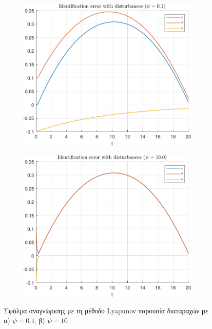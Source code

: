 \documentclass[a4paper,12pt]{article}
\begin{document}
\begin{figure}[h!]
    \centering
    \begin{subfigure}{0.45\textwidth}
        \centering
        \includegraphics[width=\linewidth]{
        plot/task2_identification_error_disturbances_1.pdf}
        \caption{}
        \label{fig:task2_identification_error_disturbances_1}
    \end{subfigure}
    \hfill
    \begin{subfigure}{0.45\textwidth}
        \centering
        \includegraphics[width=\linewidth]{
        plot/task2_identification_error_disturbances_2.pdf}
        \caption{}
        \label{fig:task2_identification_error_disturbances_2}
    \end{subfigure}
    \caption{Σφάλμα αναγνώρισης με τη μέθοδο Lyapunov
    παρουσία διαταραχών με α) $\psi = 0.1$, β) $\psi = 10$}
    \label{fig:task2_identification_error_disturbances}
\end{figure}
\end{document}
